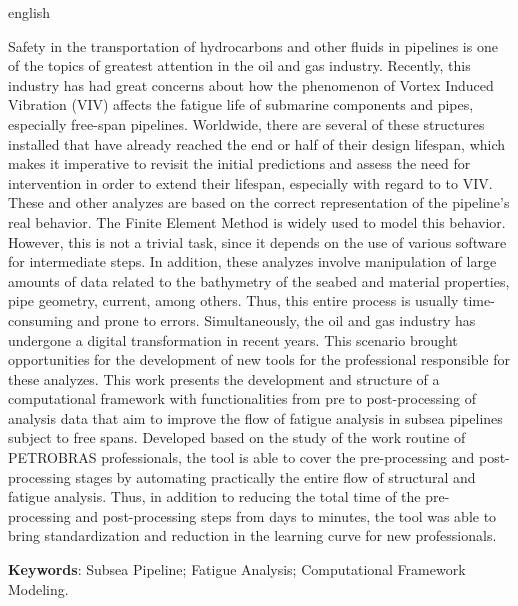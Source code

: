 \begin{resumo}[Abstract]
    \begin{otherlanguage*}{english}

    Safety in the transportation of hydrocarbons and other fluids in pipelines is one of the topics of greatest attention in the oil and gas industry.
    Recently, this industry has had great concerns about how the phenomenon of Vortex Induced Vibration (VIV) affects the fatigue life of submarine components and pipes, especially free-span pipelines.
    Worldwide, there are several of these structures installed that have already reached the end or half of their design lifespan, which makes it imperative to revisit the initial predictions and assess the need for intervention in order to extend their lifespan, especially with regard to to VIV.
    These and other analyzes are based on the correct representation of the pipeline's real behavior.
    The Finite Element Method is widely used to model this behavior.
    However, this is not a trivial task, since it depends on the use of various software for intermediate steps.
    In addition, these analyzes involve manipulation of large amounts of data related to the bathymetry of the seabed and material properties, pipe geometry, current, among others.
    Thus, this entire process is usually time-consuming and prone to errors.
    Simultaneously, the oil and gas industry has undergone a digital transformation in recent years.
    This scenario brought opportunities for the development of new tools for the professional responsible for these analyzes.
    This work presents the development and structure of a computational framework with functionalities from pre to post-processing of analysis data that aim to improve the flow of fatigue analysis in subsea pipelines subject to free spans.
    Developed based on the study of the work routine of PETROBRAS professionals, the tool is able to cover the pre-processing and post-processing stages by automating practically the entire flow of structural and fatigue analysis.
    Thus, in addition to reducing the total time of the pre-processing and post-processing steps from days to minutes, the tool was able to bring standardization and reduction in the learning curve for new professionals.

    \vspace{\onelineskip}

    \noindent
    \textbf{Keywords}: Subsea Pipeline; Fatigue Analysis; Computational Framework Modeling.
    \end{otherlanguage*}
\end{resumo}